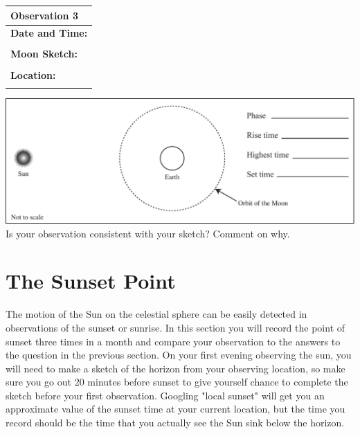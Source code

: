 \documentclass[11pt]{article}
\begin{document}
\noindent
\begin{minipage}{4.5cm}
\begin{center}
\begin{tabular}{|l|}
\hline 
 \textbf{Observation 3}
 \\
 \hline\hline
\textbf{Date and Time:}\quad\quad\quad\quad\\
\parbox{0.3\linewidth}{\vspace*{1cm}\hspace*{4cm}}
\\
\textbf{Moon Sketch:} \\
\parbox{0.3\linewidth}{\vspace*{3.5cm}\hspace*{4cm}}
\\
\textbf{Location:} \\
\parbox{0.3\linewidth}{\vspace*{1cm}\hspace*{4cm}}
\\\hline
\end{tabular}
\end{center}
\end{minipage}
\begin{minipage}{0.75\textwidth}
\includegraphics[width=\textwidth]{moon_position_in_orbit_blank}\\
\vspace*{0.5cm}
Is your observation consistent with your sketch? Comment on why.\\

\vspace*{1cm}
\hrulefill
\end{minipage}


\newpage

\section{The Sunset Point}
\label{s:s}

The motion of the Sun on the celestial sphere can be easily detected in
observations of the sunset or sunrise. In this section you will
record the point of sunset three times in a month and compare your observation to the answers to the question in the previous section. On your first evening observing the sun, you will need to make a sketch
of the horizon from your observing location, so make sure you go out 20
minutes before sunset to give yourself chance to complete the sketch before
your first observation. Googling "local sunset" will get you an approximate value
of the sunset time at your current location, but the time you record should be the 
time that you actually see the Sun sink below the horizon.
\end{document}
